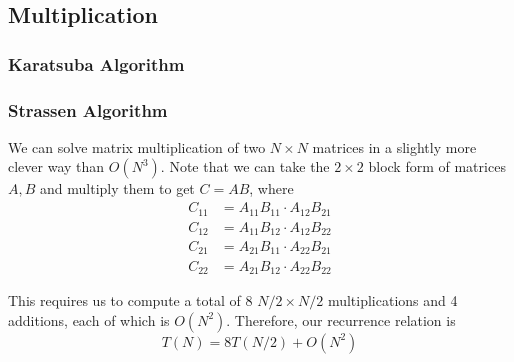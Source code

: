 \subsection{Multiplication}

  \subsubsection{Karatsuba Algorithm}


  \subsubsection{Strassen Algorithm}

    We can solve matrix multiplication of two $N \times N$ matrices in a slightly more clever way than $O(N^3)$. Note that we can take the $2 \times 2$ block form of matrices $A, B$ and multiply them to get $C = AB$, where 
    \begin{align}
      C_{11} & = A_{11} B_{11} \cdot A_{12} B_{21} \\ 
      C_{12} & = A_{11} B_{12} \cdot A_{12} B_{22} \\ 
      C_{21} & = A_{21} B_{11} \cdot A_{22} B_{21} \\ 
      C_{22} & = A_{21} B_{12} \cdot A_{22} B_{22} 
    \end{align}

    This requires us to compute a total of $8$ $N/2 \times N/2$ multiplications and 4 additions, each of which is $O(N^2)$. Therefore, our recurrence relation is 
    \begin{equation}
      T(N) = 8 T(N/2) + O(N^2)
    \end{equation}

